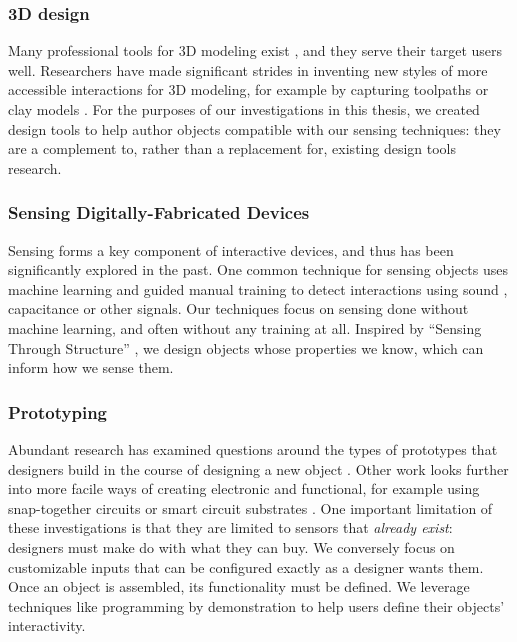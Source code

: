 \subsubsection{3D design}
Many professional tools for 3D modeling exist \cite{solidworks, rhino}, and they serve their target users well. Researchers have made significant strides in inventing new styles of more accessible interactions for 3D modeling, for example by capturing toolpaths \cite{willis-interactive} or clay models \cite{savage-mmarks}. For the purposes of our investigations in this thesis, we created design tools to help author objects compatible with our sensing techniques: they are a complement to, rather than a replacement for, existing design tools research.

\subsubsection{Sensing Digitally-Fabricated Devices}
Sensing forms a key component of interactive devices, and thus has been significantly explored in the past. One common technique for sensing objects uses machine learning and guided manual training to detect interactions using sound \cite{ono-touchandactivate,laput-acoustruments}, capacitance \cite{sato-touche} or other signals. Our techniques focus on sensing done without machine learning, and often without any training at all. Inspired by ``Sensing Through Structure'' \cite{slyper-structure}, we design objects whose properties we know, which can inform how we sense them.

\subsubsection{Prototyping}
Abundant research has examined questions around the types of prototypes that designers build in the course of designing a new object \cite{houde-prototypes}. Other work looks further into more facile ways of creating electronic and functional, for example using snap-together circuits \cite{littleBits, hartmann-dtools, villar-gadgeteer} or smart circuit substrates \cite{villar-voodooio}. One important limitation of these investigations is that they are limited to sensors that \emph{already exist}: designers must make do with what they can buy. We conversely focus on customizable inputs that can be configured exactly as a designer wants them. Once an object is assembled, its functionality must be defined. We leverage techniques like programming by demonstration \cite{myers-pbd, hartmann-dtools} to help users define their objects' interactivity.

